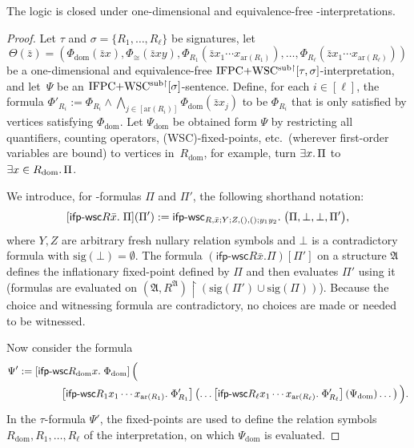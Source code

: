 \documentclass[]{lmcs}
\newcommand{\qspace}{\mathchoice{\;}{\,}{}{}}
\newcommand{\set}[1]{\lbrace #1 \rbrace}
\newcommand{\uniVarA}{x}
\newcommand{\uniVarB}{y}
\newcommand{\uniVarC}{z}
\newcommand{\formA}{\Phi}
\newcommand{\formB}{\Psi}
\newcommand{\interpret}{\Theta}
\newcommand{\rel}{R}
\newcommand{\tup}[1]{\bar{#1}}
\newcommand{\StructA}{\mathfrak{A}}
\newcommand{\reduct}[2]{#1 \upharpoonright #2}
\newcommand{\arity}[1]{\mathrm{ar}(#1)}
\newcommand{\sigA}{\tau}
\newcommand{\sigB}{\sigma}
\newcommand{\sigOf}[1]{\mathrm{sig}(#1)}
\newcommand{\ifpwscSym}{\mathsf{ifp}\text{-}\mathsf{wsc}}
\newcommand{\ifpwscbig}[8]{\ifpwscSym_{#1; #2; #3; #4}.\qspace\big(#5,#6,#7, #8\big)}
\begin{document}
\begin{lem}
	\label{lem:ipfcwsc-subformula-reduct-closed-under-one-dim-interpretations}
	The logic \IFPCWSCsub{} is closed under one-dimensional and equivalence-free   \IFPCWSCsub{}-interpretations.
\end{lem}
\begin{proof}
	Let $\sigA$ and $\sigB = \set{\rel_1,\dots, \rel_\ell}$ be signatures, let \[\interpret(\tup{\uniVarC}) = \left(\formA_{\text{dom}}(\tup{\uniVarC}\uniVarA),
	\formA_{\cong}(\tup{\uniVarC}\uniVarA\uniVarB),
	\formA_{\rel_1}(\tup{\uniVarC}\uniVarA_1\cdots \uniVarA_{\arity{\rel_1}}), \dots,
	\formA_{\rel_\ell}(\tup{\uniVarC}\uniVarA_1\cdots \uniVarA_{\arity{\rel_\ell}})\right)
	\]
	be a one-dimensional and equivalence-free  $\ifpcwscsubsig{\sigA,\sigB}$-interpretation, and let~$\formB$ be an $\ifpcwscsubsig{\sigB}$-sentence.
	Define, for each $i \in [\ell]$, the formula $\formA'_{\rel_i} := \formA_{\rel_i} \land \bigwedge_{j \in [\arity{R_i}]} \formA_{\text{dom}}(\tup{z}x_j)$
	to be $\formA_{\rel_i}$  that is only satisfied by vertices satisfying $\formA_{\text{dom}}$.
	Let $\formB_{\text{dom}}$ be obtained form $\formB$ by
	restricting all quantifiers, counting operators, (WSC)-fixed-points, etc.~(wherever first-order variables are bound) to vertices in~$R_{\text{dom}}$, for example, turn $\exists x.\qspace \Pi$ to $\exists x \in R_{\text{dom}}.\qspace \Pi$.
	
	We introduce, for \IFPCWSCsub{}-formulas $\Pi$ and $\Pi'$, the following shorthand notation:
	\[[\ifpwscSym R\tup{x}. \qspace\Pi](\Pi') := 
	\ifpwscbig{R,\tup{x}}{Y}{Z,(),()}{y_1y_2}{\Pi}{\bot}{\bot}{\Pi'},\]
	where $Y,Z$ are arbitrary fresh nullary relation symbols and $\bot$ is a contradictory formula with $\sigOf{\bot}=\emptyset$.
	The formula $(\ifpwscSym R\tup{x}. \Pi)[\Pi']$ on a structure $\StructA$
	defines the inflationary fixed-point defined by $\Pi$ and then evaluates $\Pi'$ using it (formulas are evaluated on $\reduct{(\StructA, R^\StructA)}{(\sigOf{\Pi'}\cup \sigOf{\Pi})}$).
	Because the choice and witnessing formula are contradictory, no choices are made or needed to be witnessed.
	
	Now consider the formula
	\begin{align*}
		\formB' &:= \left[\ifpwscSym \rel_{\text{dom}} \uniVarA.\qspace \formA_{\text{dom}}\right]\Big(\\
			&\qquad\qquad \left[\ifpwscSym \rel_1 \uniVarA_1\cdots \uniVarA_{\arity{\rel_1}}.\qspace\formA'_{\rel_1} \right] \left( \dots \left[\ifpwscSym \rel_\ell \uniVarA_1\cdots \uniVarA_{\arity{\rel_\ell}}.\qspace\formA'_{\rel_\ell} \right](\formB_{\text{dom}}) \dots\right)\Big).
	\end{align*}
	In the $\sigA$-formula $\formB'$, the fixed-points are used to define the relation symbols $\rel_{\text{dom}}, \rel_1,\dots,\rel_\ell$ of the interpretation,
	on which $\formB_{\text{dom}}$ is evaluated.
	

\end{proof}
\end{document}
